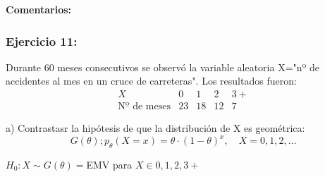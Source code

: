 \textbf{Comentarios:} %




\subsubsection*{Ejercicio 11:}  
Durante 60 meses consecutivos se observó la variable aleatoria X="nº de accidentes al mes en un cruce de carreteras". Los resultados fueron:
\[
\begin{matrix}
    X & 0 & 1&2& 3+ \\
    \text{Nº de meses} & 23 & 18 & 12 & 7
\end{matrix}
\]

a) Contrastasr la hipótesis de que la distribución de X es geométrica: 
\[
G(\theta);p_\theta(X=x)=\theta \cdot (1- \theta)^x, \quad X=0,1,2,\dots
\]

$H_0: X \sim G(\theta)=$EMV para $X \in {0,1,2,3+}$

